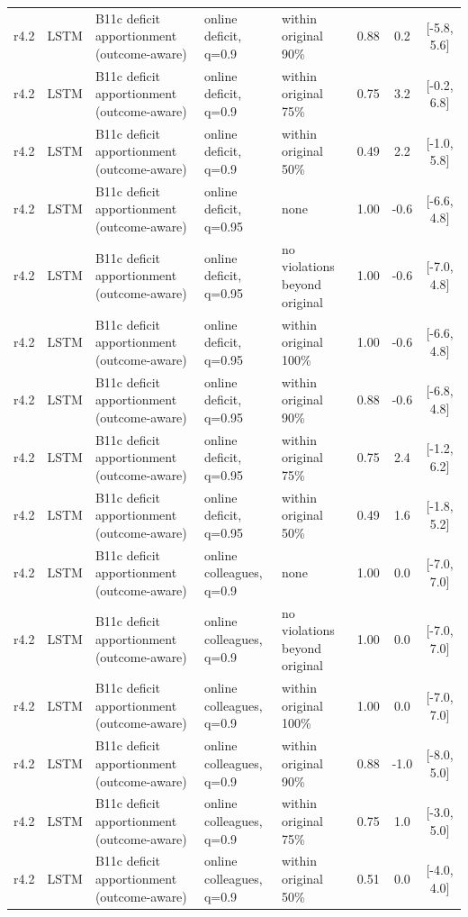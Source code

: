 \begin{longtable}{lllp{4.2cm}p{3.4cm}ccc}
r4.2 & LSTM & B11c deficit apportionment (outcome-aware) & online deficit, q=0.9 & within original 90\% & 0.88 & 0.2 & [-5.8, 5.6] \\
r4.2 & LSTM & B11c deficit apportionment (outcome-aware) & online deficit, q=0.9 & within original 75\% & 0.75 & 3.2 & [-0.2, 6.8] \\
r4.2 & LSTM & B11c deficit apportionment (outcome-aware) & online deficit, q=0.9 & within original 50\% & 0.49 & 2.2 & [-1.0, 5.8] \\
r4.2 & LSTM & B11c deficit apportionment (outcome-aware) & online deficit, q=0.95 & none & 1.00 & -0.6 & [-6.6, 4.8] \\
r4.2 & LSTM & B11c deficit apportionment (outcome-aware) & online deficit, q=0.95 & no violations beyond original & 1.00 & -0.6 & [-7.0, 4.8] \\
r4.2 & LSTM & B11c deficit apportionment (outcome-aware) & online deficit, q=0.95 & within original 100\% & 1.00 & -0.6 & [-6.6, 4.8] \\
r4.2 & LSTM & B11c deficit apportionment (outcome-aware) & online deficit, q=0.95 & within original 90\% & 0.88 & -0.6 & [-6.8, 4.8] \\
r4.2 & LSTM & B11c deficit apportionment (outcome-aware) & online deficit, q=0.95 & within original 75\% & 0.75 & 2.4 & [-1.2, 6.2] \\
r4.2 & LSTM & B11c deficit apportionment (outcome-aware) & online deficit, q=0.95 & within original 50\% & 0.49 & 1.6 & [-1.8, 5.2] \\
r4.2 & LSTM & B11c deficit apportionment (outcome-aware) & online colleagues, q=0.9 & none & 1.00 & 0.0 & [-7.0, 7.0] \\
r4.2 & LSTM & B11c deficit apportionment (outcome-aware) & online colleagues, q=0.9 & no violations beyond original & 1.00 & 0.0 & [-7.0, 7.0] \\
r4.2 & LSTM & B11c deficit apportionment (outcome-aware) & online colleagues, q=0.9 & within original 100\% & 1.00 & 0.0 & [-7.0, 7.0] \\
r4.2 & LSTM & B11c deficit apportionment (outcome-aware) & online colleagues, q=0.9 & within original 90\% & 0.88 & -1.0 & [-8.0, 5.0] \\
r4.2 & LSTM & B11c deficit apportionment (outcome-aware) & online colleagues, q=0.9 & within original 75\% & 0.75 & 1.0 & [-3.0, 5.0] \\
r4.2 & LSTM & B11c deficit apportionment (outcome-aware) & online colleagues, q=0.9 & within original 50\% & 0.51 & 0.0 & [-4.0, 4.0] \\

\end{longtable}
